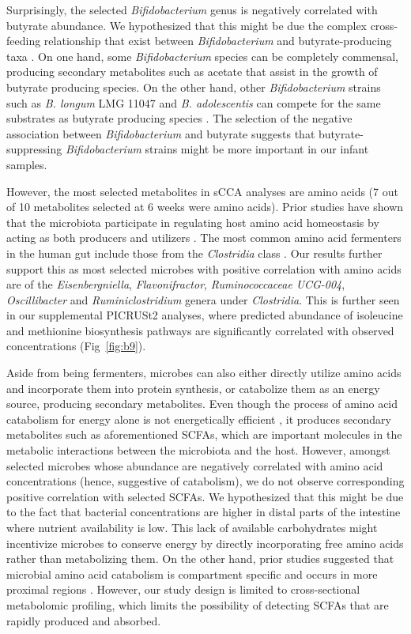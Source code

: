 Surprisingly, the selected \emph{Bifidobacterium} genus is negatively correlated with butyrate abundance. We hypothesized that this might be due the complex cross-feeding relationship that exist between \emph{Bifidobacterium} and butyrate-producing taxa \cite{riviere2016bifidobacteria}. On one hand, some \emph{Bifidobacterium} species can be completely commensal, producing secondary metabolites such as acetate that assist in the growth of butyrate producing species. On the other hand, other \emph{Bifidobacterium} strains such as \emph{B. longum} LMG 11047 and \emph{B. adolescentis} can compete for the same substrates as butyrate producing species \cite{moens2016bifidobacterial}. The selection of the negative association between \emph{Bifidobacterium} and butyrate suggests that butyrate-suppressing \emph{Bifidobacterium} strains might be more important in our infant samples. 

However, the most selected metabolites in sCCA analyses are amino acids (7 out of 10 metabolites selected at 6 weeks were amino acids). Prior studies have shown that the microbiota participate in regulating host amino acid homeostasis by acting as both producers and utilizers \cite{neis2015role}. The most common amino acid fermenters in the human gut include those from the \emph{Clostridia} class \cite{dai2011amino}. Our results further support this as most selected microbes with positive correlation with amino acids are of the \emph{Eisenbergniella}, \emph{Flavonifractor}, \emph{Ruminococcaceae UCG-004}, \emph{Oscillibacter} and \emph{Ruminiclostridium} genera under \emph{Clostridia}. This is further seen in our supplemental PICRUSt2 analyses, where predicted abundance of isoleucine and methionine biosynthesis pathways are significantly correlated with observed concentrations (Fig~\ref{fig:b9}). 

Aside from being fermenters, microbes can also either directly utilize amino acids and incorporate them into protein synthesis, or catabolize them as an energy source, producing secondary metabolites. Even though the process of amino acid catabolism for energy alone is not energetically efficient \cite{oliphant2019macronutrient}, it produces secondary metabolites such as aforementioned SCFAs, which are important molecules in the metabolic interactions between the microbiota and the host. However, amongst selected microbes whose abundance are negatively correlated with amino acid concentrations (hence, suggestive of catabolism), we do not observe corresponding positive correlation with selected SCFAs.  We hypothesized that this might be due to the fact that bacterial concentrations are higher in distal parts of the intestine \cite{ewald2018human, neis2015role} where nutrient availability is low. This lack of available carbohydrates might incentivize microbes to conserve energy by directly incorporating free amino acids rather than metabolizing them. On the other hand, prior studies suggested that microbial amino acid catabolism is compartment specific and occurs in more proximal regions \cite{dai2011amino, macfarlane2012bacteria}. However, our study design is limited to cross-sectional metabolomic profiling, which limits the possibility of detecting SCFAs that are rapidly produced and absorbed.  


